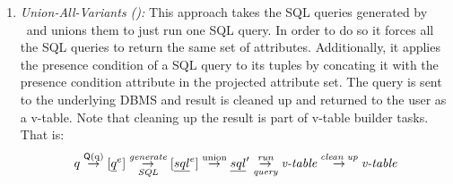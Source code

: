 \begin{enumerate}
\item
\emph{Union-All-Variants (\uav):}
This approach takes the SQL queries generated by \ubf\ and 
unions them to just run one SQL query. In order to do so it 
forces all the SQL queries to return the same set of attributes.
Additionally, it applies the presence condition of a SQL query
to its tuples by concating it with the presence condition attribute
in the projected attribute set.
The query is sent to the underlying
DBMS and result is cleaned up and returned to the user as a v-table. Note that cleaning up
the result is part of v-table builder tasks.
That is:
%
\[\vQ \mathrel{\mathop{\rightarrow}^{\mathrm{\qGroup \vQ}}} [ \annot [\dimMeta] {\pQ} ] 
\mathrel{\mathop{\rightarrow}^{\mathrm{\textit{generate}}}_{\mathrm{\textit{SQL}}}} [ \annot [\dimMeta] {\sqlQ} ]
\mathrel{\mathop{\rightarrow}^{\mathrm{union}}} {\VVal \sqlQ}
\mathrel{\mathop{\rightarrow}^{\mathrm{\textit{run}}}_{\mathrm{\textit{query}}}} \textit{v-table}
\mathrel{\mathop{\rightarrow}^{\mathrm{\textit{clean up}}}} \textit{v-table}
\]

\end{enumerate}

